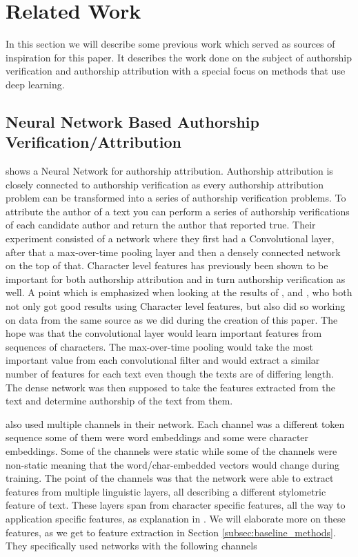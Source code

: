 \section{Related Work} \label{sec:related_work}

In this section we will describe some previous work which served as sources
of inspiration for this paper. It describes the work done on the subject of
authorship verification and authorship attribution with a special focus on
methods that use deep learning.


\subsection{Neural Network Based Authorship Verification/Attribution}

\citet{DBLP:journals/corr/RuderGB16c} shows a Neural Network for authorship
attribution. Authorship attribution is closely connected to authorship
verification as every authorship attribution problem can be transformed into a
series of authorship verification problems. To attribute the author of a text
you can perform a series of authorship verifications of each candidate author
and return the author that reported true. Their experiment consisted of a
network where they first had a Convolutional layer, after that a max-over-time
pooling layer and then a densely connected network on the top of that.
Character level features has previously been shown to be important for both
authorship attribution and in turn authorship verification as well. A point
which is emphasized when looking at the results of \citet{hansen2014}, and
\citet{aalykke2016}, who both not only got good results using Character level
features, but also did so working on data from the same source as we did during
the creation of this paper. The hope was that the convolutional layer would
learn important features from sequences of characters. The max-over-time pooling
would take the most important value from each convolutional filter and would
extract a similar number of features for each text even though the texts are
of differing length. The dense network was then supposed to take the features
extracted from the text and determine authorship of the text from them.

\citet{DBLP:journals/corr/RuderGB16c} also used multiple channels in their
network. Each channel was a different token sequence some of them were
word embeddings and some were character embeddings. Some of the channels
were static while some of the channels were non-static meaning that the
word/char-embedded vectors would change during training. The point of the
channels was that the network were able to extract features from multiple
linguistic layers, all describing a different stylometric feature of text.
These layers span from character specific features, all the way to application
specific features, as explanation in \citet[Section 2]{stamatos2009}. We will
elaborate more on these features, as we get to feature extraction in Section
\ref{subsec:baseline_methods}. They specifically used networks with the
following channels

